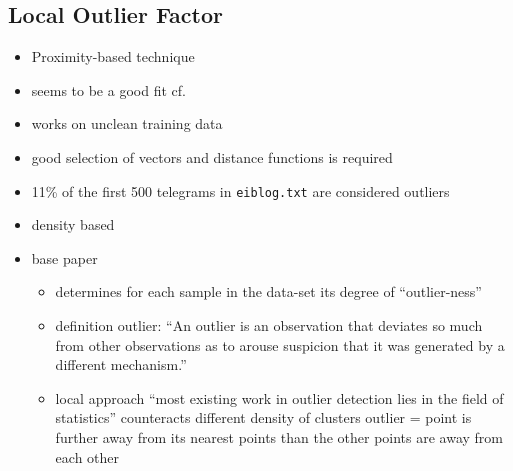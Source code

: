 	\subsection{Local Outlier Factor}
	\begin{itemize}
		\item Proximity-based technique
		\item seems to be a good fit cf. \textcite{Lazarevic2003}
		\item works on unclean training data
		\item good selection of vectors and distance functions is required
		\item 11\% of the first 500 telegrams in \verb|eiblog.txt| are considered outliers
		\item density based
		\item base paper \textcite{Breunig2000}
			\begin{itemize}
				\item determines for each sample in the data-set its degree of \enquote{outlier-ness} \parencite{Breunig2000}
				\item definition outlier: \enquote{An outlier is an observation that deviates so much from other
					observations as to arouse suspicion that it was generated by a
					different mechanism.} \parencite{Hawkins1980}
				\item local approach
					\subitem \enquote{most existing work in outlier detection lies in the field of statistics} \parencite{Breunig2000}
					\subitem counteracts different density of clusters
					\subitem outlier = point is further away from its nearest points than the other points are away from each other
			\end{itemize}
	\end{itemize}
	
